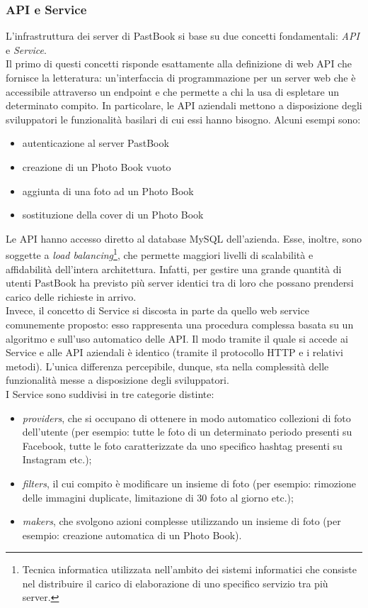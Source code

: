 			\subsubsection{API e Service}
				L'infrastruttura dei server di PastBook si base su due concetti fondamentali: \emph{API} e \emph{Service}.\\
				Il primo di questi concetti risponde esattamente alla definizione di web API che fornisce la letteratura:
				un'interfaccia di programmazione per un server web che è accessibile attraverso un endpoint e che permette a chi la
				usa di espletare un determinato compito. In particolare, le API aziendali mettono a disposizione degli sviluppatori
				le funzionalità basilari di cui essi hanno bisogno. Alcuni esempi sono:
				\begin{itemize}
					\item autenticazione al server PastBook
					\item creazione di un Photo Book vuoto
					\item aggiunta di una foto ad un Photo Book
					\item sostituzione della cover di un Photo Book
				\end{itemize}
				Le API hanno accesso diretto al database MySQL dell'azienda. Esse, inoltre, sono soggette a
				\emph{load balancing}\footnote{Tecnica informatica utilizzata nell'ambito dei sistemi informatici che consiste nel distribuire il carico di elaborazione di uno specifico
servizio tra più server.}, che permette maggiori livelli di scalabilità e
				affidabilità dell'intera architettura. Infatti, per gestire una grande quantità di utenti PastBook ha previsto più
				server identici tra di loro che possano prendersi carico delle richieste in arrivo.\\
				Invece, il concetto di Service si discosta in parte da quello web service comunemente proposto: esso rappresenta
				una procedura complessa basata su un algoritmo e sull'uso automatico delle API. Il modo tramite il quale si accede ai
				Service e alle API aziendali è identico (tramite il protocollo HTTP e i relativi metodi). L'unica differenza
				percepibile, dunque, sta nella complessità delle funzionalità messe a disposizione degli sviluppatori.\\
				I Service sono suddivisi in tre categorie distinte:
				\begin{itemize}
					\item \emph{providers}, che si occupano di ottenere in modo automatico collezioni di foto dell'utente (per
					esempio: tutte le foto di un determinato periodo presenti su Facebook, tutte le foto caratterizzate da uno
					specifico hashtag presenti su Instagram etc.);
					\item \emph{filters}, il cui compito è modificare un insieme di foto (per esempio: rimozione delle
					immagini duplicate, limitazione di 30 foto al giorno etc.);
					\item \emph{makers}, che svolgono azioni complesse utilizzando un insieme di foto (per esempio: creazione
					automatica di un Photo Book).
				\end{itemize}
				
